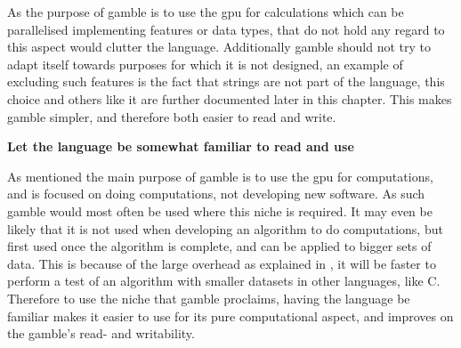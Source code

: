 As the purpose of \gls{gamble} is to use the \acrshort{gpu} for calculations which can be parallelised implementing features or data types, that do not hold any regard to this aspect would clutter the language.
Additionally \gls{gamble} should not try to adapt itself towards purposes for which it is not designed, an example of excluding such features is the fact that strings are not part of the language, this choice and others like it are further documented later in this chapter.
This makes \gls{gamble} simpler, and therefore both easier to read and write.

\textbf{Let the language be somewhat familiar to read and use}

As mentioned the main purpose of \gls{gamble} is to use the \acrshort{gpu} for computations, and is focused on doing computations, not developing new software.
As such \gls{gamble} would most often be used where this niche is required.
It may even be likely that it is not used when developing an algorithm to do computations, but first used once the algorithm is complete, and can be applied to bigger sets of data.
This is because of the large overhead as explained in , it will be faster to perform a test of an algorithm with smaller datasets in other languages, like C.
Therefore to use the niche that \gls{gamble} proclaims, having the language be familiar makes it easier to use for its pure computational aspect, and improves on the \gls{gamble}'s read- and writability.